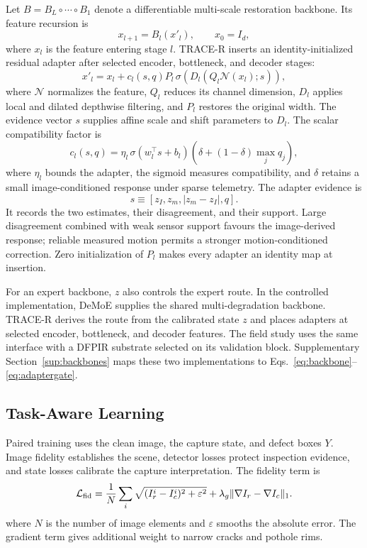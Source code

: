\documentclass[journal]{IEEEtran}
\begin{document}
Let $B=B_L\circ\cdots\circ B_1$ denote a differentiable multi-scale restoration backbone. Its feature recursion is
\begin{equation}
x_{l+1}=B_l(x'_l),\qquad x_0=I_d,
\label{eq:backbone}
\end{equation}
where $x_l$ is the feature entering stage $l$. TRACE-R inserts an identity-initialized residual adapter after selected encoder, bottleneck, and decoder stages:
\begin{equation}
x'_l=x_l+c_l(s,q)P_l\,\sigma\!\left(D_l(Q_l\mathcal{N}(x_l);s)\right),
\label{eq:adapter}
\end{equation}
where $\mathcal{N}$ normalizes the feature, $Q_l$ reduces its channel dimension, $D_l$ applies local and dilated depthwise filtering, and $P_l$ restores the original width. The evidence vector $s$ supplies affine scale and shift parameters to $D_l$. The scalar compatibility factor is
\begin{equation}
c_l(s,q)=\eta_l\,\sigma(w_l^\top s+b_l)\left(\delta+(1-\delta)\max_j q_j\right),
\label{eq:adaptergate}
\end{equation}
where $\eta_l$ bounds the adapter, the sigmoid measures compatibility, and $\delta$ retains a small image-conditioned response under sparse telemetry. The adapter evidence is
\[
s\equiv[z_I,z_m,|z_m-z_I|,q].
\]
It records the two estimates, their disagreement, and their support. Large disagreement combined with weak sensor support favours the image-derived response; reliable measured motion permits a stronger motion-conditioned correction. Zero initialization of $P_l$ makes every adapter an identity map at insertion.

For an expert backbone, $z$ also controls the expert route. In the controlled implementation, DeMoE supplies the shared multi-degradation backbone. TRACE-R derives the route from the calibrated state $z$ and places adapters at selected encoder, bottleneck, and decoder features. The field study uses the same interface with a DFPIR substrate selected on its validation block. Supplementary Section~\ref{sup:backbones} maps these two implementations to Eqs.~\eqref{eq:backbone}--\eqref{eq:adaptergate}.

\subsection{Task-Aware Learning}
Paired training uses the clean image, the capture state, and defect boxes $Y$. Image fidelity establishes the scene, detector losses protect inspection evidence, and state losses calibrate the capture interpretation. The fidelity term is
\begin{equation}
\mathcal{L}_{\rm fid}=\frac{1}{N}\sum_i\sqrt{(I_r^i-I_c^i)^2+\varepsilon^2}
+\lambda_g\|\nabla I_r-\nabla I_c\|_1.
\label{eq:fidelity}
\end{equation}
where $N$ is the number of image elements and $\varepsilon$ smooths the absolute error. The gradient term gives additional weight to narrow cracks and pothole rims.
\end{document}
